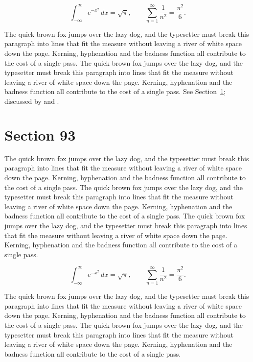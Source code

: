 \documentclass{article}
\begin{document}
\begin{equation}\label{eq:92}
\int_{-\infty}^{\infty} e^{-x^{2}}\,dx = \sqrt{\pi}, \qquad
\sum_{n=1}^{\infty} \frac{1}{n^{2}} = \frac{\pi^{2}}{6}.
\end{equation}

The quick brown fox jumps over the lazy dog, and the typesetter must break this paragraph into lines that fit the measure without leaving a river of white space down the page. Kerning, hyphenation and the badness function all contribute to the cost of a single pass. The quick brown fox jumps over the lazy dog, and the typesetter must break this paragraph into lines that fit the measure without leaving a river of white space down the page. Kerning, hyphenation and the badness function all contribute to the cost of a single pass. 
See Section~\ref{sec:93}; discussed by \textcite{k3} and \textcite{l5}.
\section{Section 93}
\label{sec:93}
The quick brown fox jumps over the lazy dog, and the typesetter must break this paragraph into lines that fit the measure without leaving a river of white space down the page. Kerning, hyphenation and the badness function all contribute to the cost of a single pass. The quick brown fox jumps over the lazy dog, and the typesetter must break this paragraph into lines that fit the measure without leaving a river of white space down the page. Kerning, hyphenation and the badness function all contribute to the cost of a single pass. The quick brown fox jumps over the lazy dog, and the typesetter must break this paragraph into lines that fit the measure without leaving a river of white space down the page. Kerning, hyphenation and the badness function all contribute to the cost of a single pass. 

\begin{equation}\label{eq:93}
\int_{-\infty}^{\infty} e^{-x^{2}}\,dx = \sqrt{\pi}, \qquad
\sum_{n=1}^{\infty} \frac{1}{n^{2}} = \frac{\pi^{2}}{6}.
\end{equation}

The quick brown fox jumps over the lazy dog, and the typesetter must break this paragraph into lines that fit the measure without leaving a river of white space down the page. Kerning, hyphenation and the badness function all contribute to the cost of a single pass. The quick brown fox jumps over the lazy dog, and the typesetter must break this paragraph into lines that fit the measure without leaving a river of white space down the page. Kerning, hyphenation and the badness function all contribute to the cost of a single pass. 
\end{document}
